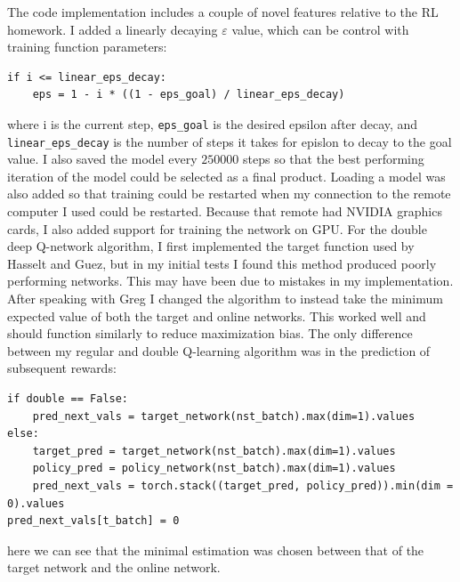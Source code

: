 \documentclass{homework}
\begin{document}
The code implementation includes a couple of novel features relative to the RL homework. I added a linearly decaying $\varepsilon$ value, which can be control with training function parameters:
\begin{verbatim}
if i <= linear_eps_decay:
    eps = 1 - i * ((1 - eps_goal) / linear_eps_decay)
\end{verbatim}
where i is the current step, \texttt{eps_goal} is the desired epsilon after decay, and \texttt{linear_eps_decay} is the number of steps it takes for epislon to decay to the goal value. I also saved the model every $250000$ steps so that the best performing iteration of the model could be selected as a final product. Loading a model was also added so that training could be restarted when my connection to the remote computer I used could be restarted. Because that remote had NVIDIA graphics cards, I also added support for training the network on GPU.
For the double deep Q-network algorithm,  I first implemented the target function used by Hasselt and Guez, but in my initial tests I found this method produced poorly performing networks. This may have been due to mistakes in my implementation. After speaking with Greg I changed the algorithm to instead take the minimum expected value of both the target and online networks. This worked well and should function similarly to reduce maximization bias. The only difference between my regular and double Q-learning algorithm was in the prediction of subsequent rewards:
\begin{verbatim}
if double == False:
    pred_next_vals = target_network(nst_batch).max(dim=1).values
else:
    target_pred = target_network(nst_batch).max(dim=1).values
    policy_pred = policy_network(nst_batch).max(dim=1).values
    pred_next_vals = torch.stack((target_pred, policy_pred)).min(dim = 0).values
pred_next_vals[t_batch] = 0
\end{verbatim}
here we can see that the minimal estimation was chosen between that of the target network and the online network.
\newpage
\end{document}
